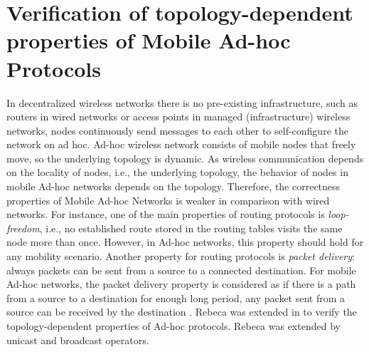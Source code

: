 \documentclass[conference]{IEEEtran}
\begin{document}
	\section{Verification of topology-dependent properties of Mobile Ad-hoc Protocols}\label{sec::wrebeca} 
	In decentralized wireless networks there is no pre-existing infrastructure, such as routers in wired networks or access points in managed (infrastructure) wireless networks, nodes continuously send messages to each other to self-configure the network on ad hoc. %
	Ad-hoc wireless network consists of mobile nodes that freely move, so the underlying topology is dynamic. As wireless communication depends on the locality of nodes, i.e., the underlying topology, the behavior of nodes in mobile Ad-hoc networks depends on the topology. Therefore, the correctness properties of Mobile Ad-hoc Networks is weaker in comparison with wired networks. For instance, one of the main properties of routing protocols is \emph{loop-freedom}, i.e., no established route stored in the routing tables visits the same node more than once. However, in Ad-hoc networks, this property should hold for any mobility scenario. Another property for routing protocols is \emph{packet delivery}: always packets can be sent from a source to a connected destination. For mobile Ad-hoc networks, the packet delivery property is considered as if there is a path from a source to a destination for enough long period, any packet sent from a source can be received by the destination \cite{GlabbeekAWN}. Rebeca was extended in \cite{FOAC} to verify the topology-dependent properties of Ad-hoc protocols. Rebeca was extended by unicast and broadcast operators. %
	
\end{document}

